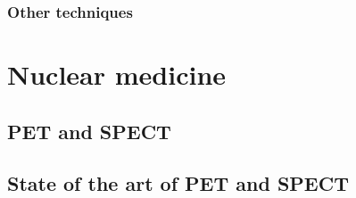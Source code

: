 \subsubsection{Other techniques}\label{chap1::subsec::rangeComplTechniques}




\section{Nuclear medicine}\label{chap1::sec::NuclearMed}


\subsection{PET and SPECT}\label{chap1::subsec::PET-SPECT}


\subsection{State of the art of PET and SPECT}


\clearpage
